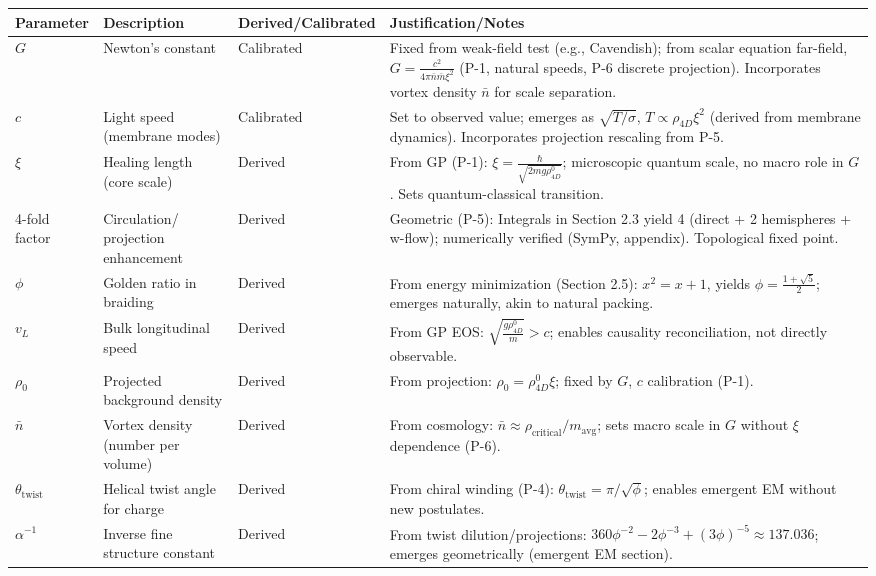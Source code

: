 \begin{table}[H]
\centering
\small
\begin{tabularx}{\linewidth}{|p{1.5cm}|p{2cm}|l|Y|}
\hline
Parameter & Description & Derived/Calibrated & Justification/Notes \\
\hline
$G$ & Newton's constant & Calibrated & Fixed from weak-field test (e.g., Cavendish); from scalar equation far-field, $G = \frac{c^2}{4\pi \bar{n} \bar{m} \xi^2}$ (P-1, natural speeds, P-6 discrete projection). Incorporates vortex density $\bar{n}$ for scale separation. \\
\hline
$c$ & Light speed (membrane modes) & Calibrated & Set to observed value; emerges as $\sqrt{T / \sigma}$, $T \propto \rho_{4D} \xi^2$ (derived from membrane dynamics). Incorporates projection rescaling from P-5. \\
\hline
$\xi$ & Healing length (core scale) & Derived & From GP (P-1): $\xi = \frac{\hbar}{\sqrt{2 m g \rho_{4D}^0}}$; microscopic quantum scale, no macro role in $G$. Sets quantum-classical transition. \\
-fold factor & Circulation/ projection enhancement & Derived & Geometric (P-5): Integrals in Section 2.3 yield 4 (direct + 2 hemispheres + w-flow); numerically verified (SymPy, appendix). Topological fixed point. \\
\hline
$\phi$ & Golden ratio in braiding & Derived & From energy minimization (Section 2.5): $x^2 = x + 1$, yields $\phi = \frac{1 + \sqrt{5}}{2}$; emerges naturally, akin to natural packing. \\
\hline
$v_L$ & Bulk longitudinal speed & Derived & From GP EOS: $\sqrt{\frac{g \rho_{4D}^0}{m}} > c$; enables causality reconciliation, not directly observable. \\
\hline
$\rho_0$ & Projected background density & Derived & From projection: $\rho_0 = \rho_{4D}^0 \xi$; fixed by $G$, $c$ calibration (P-1). \\
\hline
$\bar{n}$ & Vortex density (number per volume) & Derived & From cosmology: $\bar{n} \approx \rho_{\text{critical}} / m_{\text{avg}}$; sets macro scale in $G$ without $\xi$ dependence (P-6). \\
\hline
$\theta_{\text{twist}}$ & Helical twist angle for charge & Derived & From chiral winding (P-4): $\theta_{\text{twist}} = \pi / \sqrt{\phi}$; enables emergent EM without new postulates. \\
\hline
$\alpha^{-1}$ & Inverse fine structure constant & Derived & From twist dilution/projections: $360 \phi^{-2} - 2 \phi^{-3} + (3 \phi)^{-5} \approx 137.036$; emerges geometrically (emergent EM section). \\

\end{tabularx}
\end{table}

